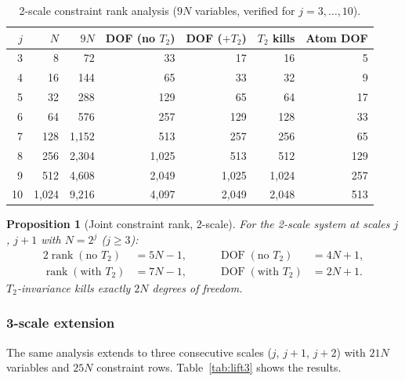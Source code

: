 \documentclass[11pt,a4paper]{article}
\newtheorem{proposition}{Proposition}
\begin{document}
\begin{table}[h]
\centering
\caption{2-scale constraint rank analysis ($9N$ variables,
  verified for $j = 3, \ldots, 10$).}
\label{tab:lift2}
\begin{tabular}{rrrrrrr}
\toprule
$j$ & $N$ & $9N$ & DOF (no $T_2$) & DOF ($+T_2$) & $T_2$ kills & Atom DOF \\
\midrule
 3 &      8 &     72 &    33 &    17 &    16 &    5 \\
 4 &     16 &    144 &    65 &    33 &    32 &    9 \\
 5 &     32 &    288 &   129 &    65 &    64 &   17 \\
 6 &     64 &    576 &   257 &   129 &   128 &   33 \\
 7 &    128 &  1{,}152 &   513 &   257 &   256 &   65 \\
 8 &    256 &  2{,}304 & 1{,}025 &   513 &   512 &  129 \\
 9 &    512 &  4{,}608 & 2{,}049 & 1{,}025 & 1{,}024 &  257 \\
10 &  1{,}024 &  9{,}216 & 4{,}097 & 2{,}049 & 2{,}048 &  513 \\
\bottomrule
\end{tabular}
\end{table}

\begin{proposition}[Joint constraint rank, 2-scale]
\label{prop:liftrank}
For the 2-scale system at scales $j$, $j+1$ with $N = 2^j$ ($j \ge 3$):
\begin{alignat*}{2}
\operatorname{rank}(\text{no } T_2) &= 5N - 1,
  &\qquad \operatorname{DOF}(\text{no } T_2) &= 4N + 1, \\
\operatorname{rank}(\text{with } T_2) &= 7N - 1,
  &\qquad \operatorname{DOF}(\text{with } T_2) &= 2N + 1.
\end{alignat*}
$T_2$-invariance kills exactly $2N$ degrees of freedom.
\end{proposition}

\subsubsection*{3-scale extension}

The same analysis extends to three consecutive scales ($j$, $j+1$, $j+2$)
with $21N$ variables and $25N$ constraint rows.
Table~\ref{tab:lift3} shows the results.
\end{document}
